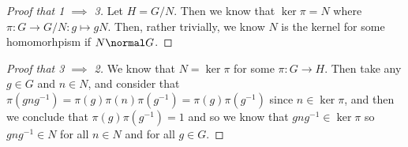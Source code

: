 \begin{proof}[Proof that 1 $\implies$ 3]
Let $H = G / N$. Then we know that $\ker \pi = N$ where $\pi : G \to G/N : g \mapsto gN$. Then, rather trivially, we know $N$ is the kernel for some homomorhpism if $N \normal G$.
\end{proof}

\begin{proof}[Proof that 3 $\implies$ 2]
We know that $N = \ker \pi$ for some $\pi : G \to H$. Then take any $g \in G$ and $n \in N$, and consider that $\pi(gng^{-1}) = \pi(g)\pi(n)\pi(g^{-1}) = \pi(g)\pi(g^{-1})$ since $n \in \ker \pi$, and then we conclude that $\pi(g)\pi(g^{-1}) = 1$ and so we know that $gng^{-1} \in \ker\pi$ so $gng^{-1} \in N$ for all $n \in N$ and for all $g \in G$.
\end{proof}